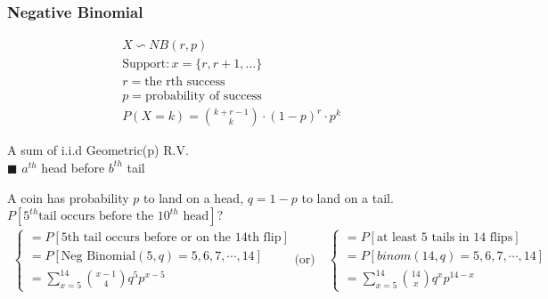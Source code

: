 \subsubsection*{Negative Binomial}
\begin{tcolorbox}
	\begin{gather*}
	X \backsim NB(r,p)\\
	\text{Support}: x = \{ r, r+1, \ldots \}\\
	r = \text{the rth success}\\
	p = \text{probability of success}\\
	P(X = k) = \binom{k + r-1}{k} \cdot (1-p)^r \cdot p^k
 	\end{gather*}
\end{tcolorbox}
A sum of i.i.d Geometric(p) R.V.\\
$\blacksquare$ $a^{th}$ head before $b^{th}$ tail
\begin{example}
	A coin has probability $p$ to land on a head, $q = 1-p$ to land on a tail.\\
	$P[5^{th} \text{tail occurs before the } 10^{th} \text{ head}]$?
	\begin{gather*}
	\begin{cases}
		= P[\text{5th tail occurs before or on the 14th flip}]\\
		= P[\text{Neg Binomial}(5,q) = 5,6,7,\cdots, 14]\\
		= \sum\limits_{x=5}^{14} \binom{x-1}{4} q^5 p^{x-5}
	\end{cases}	\text{(or)} \quad
	\begin{cases}
		= P[\text{at least 5 tails in 14 flips}]\\
		= P[binom(14,q) = 5,6,7,\cdots, 14]\\
		= \sum\limits_{x=5}^{14} \binom{14}{x} q^x p^{14-x}
	\end{cases}
	\end{gather*}
\end{example}
